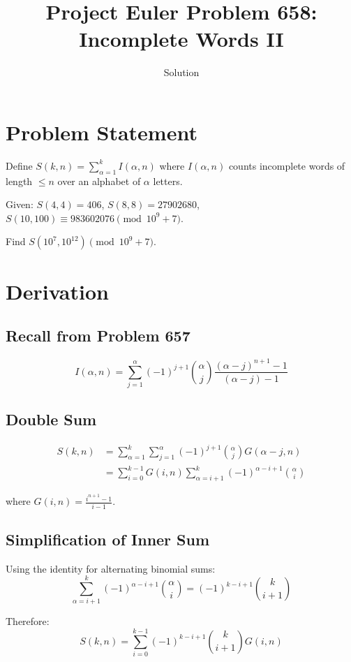 \documentclass[12pt]{article}
\title{Project Euler Problem 658: Incomplete Words II}
\author{Solution}
\date{}
\begin{document}
\maketitle

\section{Problem Statement}

Define $S(k,n) = \sum_{\alpha=1}^{k} I(\alpha, n)$ where $I(\alpha,n)$ counts incomplete words of length $\leq n$ over an alphabet of $\alpha$ letters.

Given: $S(4,4) = 406$, $S(8,8) = 27902680$, $S(10,100) \equiv 983602076 \pmod{10^9+7}$.

Find $S(10^7, 10^{12}) \pmod{10^9+7}$.

\section{Derivation}

\subsection{Recall from Problem 657}

\[
I(\alpha, n) = \sum_{j=1}^{\alpha}(-1)^{j+1}\binom{\alpha}{j}\frac{(\alpha-j)^{n+1}-1}{(\alpha-j)-1}
\]

\subsection{Double Sum}

\begin{align}
S(k,n) &= \sum_{\alpha=1}^{k}\sum_{j=1}^{\alpha}(-1)^{j+1}\binom{\alpha}{j}G(\alpha-j,n) \\
&= \sum_{i=0}^{k-1}G(i,n)\sum_{\alpha=i+1}^{k}(-1)^{\alpha-i+1}\binom{\alpha}{i}
\end{align}

where $G(i,n) = \frac{i^{n+1}-1}{i-1}$.

\subsection{Simplification of Inner Sum}

Using the identity for alternating binomial sums:
\[
\sum_{\alpha=i+1}^{k}(-1)^{\alpha-i+1}\binom{\alpha}{i} = (-1)^{k-i+1}\binom{k}{i+1}
\]

Therefore:
\[
S(k,n) = \sum_{i=0}^{k-1}(-1)^{k-i+1}\binom{k}{i+1}G(i,n)
\]
\end{document}
